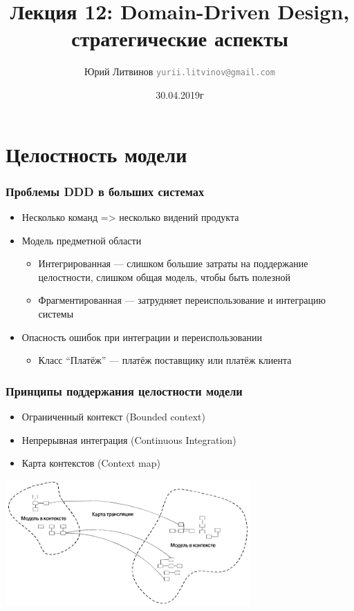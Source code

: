 \documentclass[xetex,mathserif,serif]{beamer}
\title{Лекция 12: Domain-Driven Design, стратегические аспекты}
\author[Юрий Литвинов]{Юрий Литвинов \newline \textcolor{gray}{\small\texttt{yurii.litvinov@gmail.com}}}
\date{30.04.2019г}
\begin{document}
	
	\frame{\titlepage}

	\section{Целостность модели}

	\begin{frame}
		\frametitle{Проблемы DDD в больших системах}
		\begin{itemize}
			\item Несколько команд => несколько видений продукта
			\item Модель предметной области
			\begin{itemize}
				\item Интегрированная --- слишком большие затраты на поддержание целостности, слишком общая модель, чтобы быть полезной
				\item Фрагментированная --- затрудняет переиспользование и интеграцию системы
			\end{itemize}
			\item Опасность ошибок при интеграции и переиспользовании
			\begin{itemize}
				\item Класс ``Платёж'' --- платёж поставщику или платёж клиента
			\end{itemize}
		\end{itemize}
	\end{frame}

	\begin{frame}
		\frametitle{Принципы поддержания целостности модели}
		\begin{itemize}
			\item Ограниченный контекст (Bounded context)
			\item Непрерывная интеграция (Continuous Integration)
			\item Карта контекстов (Context map)
		\end{itemize}
		\begin{center}
			\includegraphics[width=0.7\textwidth]{contextMap.png}
		\end{center}
	\end{frame}
\end{document}

